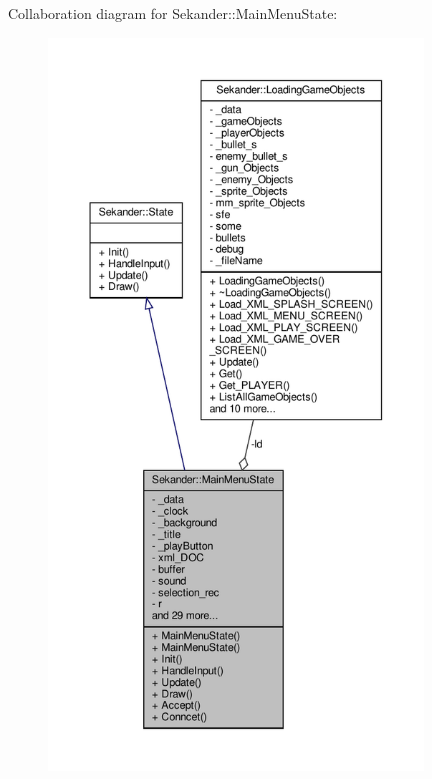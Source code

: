 Collaboration diagram for Sekander\+:\+:Main\+Menu\+State\+:
\nopagebreak
\begin{figure}[H]
\begin{center}
\leavevmode
\includegraphics[height=550pt]{classSekander_1_1MainMenuState__coll__graph}
\end{center}
\end{figure}
